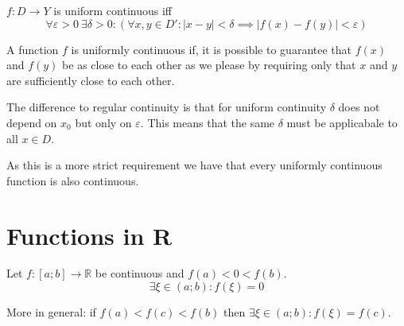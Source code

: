 \begin{definition}
   \(f: D \to Y\) is uniform continuous iff
   \[\forall \varepsilon > 0~\exists \delta > 0: (\forall x,y \in D': |x - y| < \delta \implies |f(x) - f(y)| < \varepsilon)\]
\end{definition}
\begin{remark}[Intuition]
   A function \(f\) is uniformly continuous if, it is possible to guarantee that \(f(x)\) and \(f(y)\) be as close to each other as we please by requiring only that \(x\) and \(y\) are sufficiently close to each other.
\end{remark}
\begin{remark}
   The difference to regular continuity is that for uniform continuity \(\delta\) does not depend on \(x_0\) but only on \(\varepsilon\).
   This means that the same \(\delta\) must be applicabale to all \(x \in D\).

   As this is a more strict requirement we have that every uniformly continuous function is also continuous.
\end{remark}

\section{Functions in R}
\begin{theorem}\label{thm:intmd_value}
   Let \(f: [a; b] \to \mathbb{R}\) be continuous and \(f(a) < 0 < f(b)\).
   \[\exists \xi \in (a;b): f(\xi) = 0\]
\end{theorem}
\begin{remark}
   More in general: if \(f(a) < f(c) < f(b)\) then \(\exists \xi \in (a;b): f(\xi) = f(c)\).
\end{remark}

